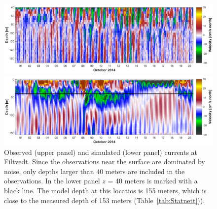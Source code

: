 \begin{figure}[ht]
\centerline{
\includegraphics*[trim=0 0 0 0,clip=true,width=\textwidth]{Figurer/Filtvedt_obs_cur}}
\centerline{
\includegraphics*[trim=0 0 0 0,clip=true,width=\textwidth]{Figurer/Filtvedt_sim_cur}}
\caption{\small
Observed (upper panel) and simulated (lower panel) currents at Filtvedt. Since the observations near the surface are dominated by noise, only depths larger than 40 meters are included in the observations. In the lower panel $z$ = 40 meters is marked with a black line. The model depth at this locatios is 155 meters, which is close to the measured depth of 153 meters (Table~\ref{tab:Statnett})).}
\label{fig:Filtvedt-cur}
\end{figure}

